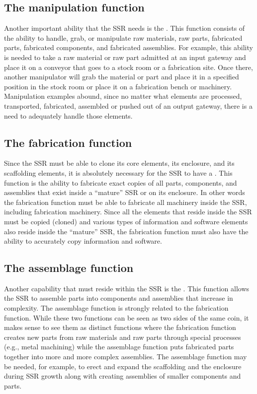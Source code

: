 \subsection[The manipulation function]{The manipulation function}
Another important ability that the SSR needs is the
. This
function consists of the ability to handle, grab, or manipulate raw
materials, raw parts, fabricated parts, fabricated components, and
fabricated assemblies. For example, this ability is needed
to take a raw material or raw part admitted at an input gateway and
place it on a conveyor that goes to a stock room or a
fabrication site. Once there, another manipulator will grab the material or
part and place it in a specified position in the stock room or place it
on a fabrication bench or machinery. Manipulation examples abound,
since no matter what elements are processed, transported, fabricated,
assembled or pushed out of an output gateway, there is a need to
adequately handle those elements.

\subsection[The fabrication function]{The fabrication function}

Since the SSR must be able to
clone its core elements, its enclosure, and its scaffolding elements,
it is absolutely necessary for the SSR to have a . 
This function is the ability to fabricate exact copies of
all parts, components, and assemblies that exist inside a ``mature'' SSR
or on its enclosure. In other words the fabrication function must be
able to fabricate all machinery inside the SSR, including fabrication
machinery. Since all the elements that reside inside the SSR must be
copied (cloned) and various types of information and software elements
also reside inside the ``mature'' SSR, 
the fabrication function must also have the ability to
accurately copy information and software.

\subsection[The assemblage function]{The assemblage function}

Another capability that must
reside within the SSR is the . This function allows
the SSR to assemble parts into
components and assemblies that increase in complexity. The assemblage
function is strongly related to the fabrication function. While these two
functions can be seen as two sides of the same coin, it makes sense
to see them as distinct functions where the fabrication function
creates new parts from raw materials and raw parts through special
processes (e.g., metal machining) while the assemblage function puts
fabricated parts together into more and more complex assemblies.
The assemblage function may be needed, for example,
to erect and expand the scaffolding and the enclosure during SSR
growth along with creating assemblies of smaller components
and parts.

